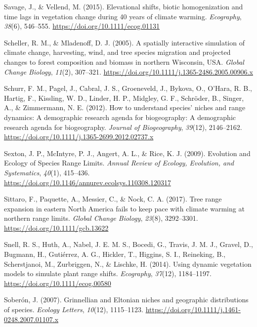 \documentclass[
]{article}
\begin{document}
\leavevmode\hypertarget{ref-savage_elevational_2015}{}%
Savage, J., \& Vellend, M. (2015). Elevational shifts, biotic
homogenization and time lags in vegetation change during 40 years of
climate warming. \emph{Ecography}, \emph{38}(6), 546--555.
\url{https://doi.org/10.1111/ecog.01131}

\leavevmode\hypertarget{ref-scheller_spatially_2005}{}%
Scheller, R. M., \& Mladenoff, D. J. (2005). A spatially interactive
simulation of climate change, harvesting, wind, and tree species
migration and projected changes to forest composition and biomass in
northern Wisconsin, USA. \emph{Global Change Biology}, \emph{11}(2),
307--321. \url{https://doi.org/10.1111/j.1365-2486.2005.00906.x}

\leavevmode\hypertarget{ref-schurr_how_2012}{}%
Schurr, F. M., Pagel, J., Cabral, J. S., Groeneveld, J., Bykova, O.,
O'Hara, R. B., Hartig, F., Kissling, W. D., Linder, H. P., Midgley, G.
F., Schröder, B., Singer, A., \& Zimmermann, N. E. (2012). How to
understand species' niches and range dynamics: A demographic research
agenda for biogeography: A demographic research agenda for biogeography.
\emph{Journal of Biogeography}, \emph{39}(12), 2146--2162.
\url{https://doi.org/10.1111/j.1365-2699.2012.02737.x}

\leavevmode\hypertarget{ref-sexton_evolution_2009}{}%
Sexton, J. P., McIntyre, P. J., Angert, A. L., \& Rice, K. J. (2009).
Evolution and Ecology of Species Range Limits. \emph{Annual Review of
Ecology, Evolution, and Systematics}, \emph{40}(1), 415--436.
\url{https://doi.org/10.1146/annurev.ecolsys.110308.120317}

\leavevmode\hypertarget{ref-sittaro_tree_2017}{}%
Sittaro, F., Paquette, A., Messier, C., \& Nock, C. A. (2017). Tree
range expansion in eastern North America fails to keep pace with climate
warming at northern range limits. \emph{Global Change Biology},
\emph{23}(8), 3292--3301. \url{https://doi.org/10.1111/gcb.13622}

\leavevmode\hypertarget{ref-snell_using_2014}{}%
Snell, R. S., Huth, A., Nabel, J. E. M. S., Bocedi, G., Travis, J. M.
J., Gravel, D., Bugmann, H., Gutiérrez, A. G., Hickler, T., Higgins, S.
I., Reineking, B., Scherstjanoi, M., Zurbriggen, N., \& Lischke, H.
(2014). Using dynamic vegetation models to simulate plant range shifts.
\emph{Ecography}, \emph{37}(12), 1184--1197.
\url{https://doi.org/10.1111/ecog.00580}

\leavevmode\hypertarget{ref-soberon_grinnellian_2007}{}%
Soberón, J. (2007). Grinnellian and Eltonian niches and geographic
distributions of species. \emph{Ecology Letters}, \emph{10}(12),
1115--1123. \url{https://doi.org/10.1111/j.1461-0248.2007.01107.x}
\end{document}
